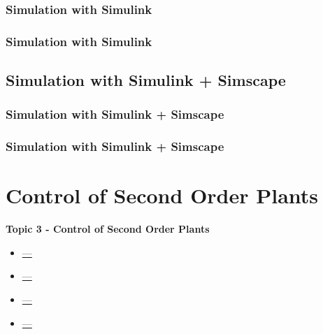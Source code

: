 \documentclass[fleqn]{beamer} %
\newcommand{\sectionIIItitle}{Control of Second Order Plants}
\newcommand{\sectionIIsubsectionIIItitle}{Simulation with Simulink}
\newcommand{\sectionIIsubsectionIVtitle}{Simulation with Simulink + Simscape}
\newcommand{\sectionIIIsubsectionItitle}{---}
\newcommand{\sectionIIIsubsectionIItitle}{---}
\newcommand{\sectionIIIsubsectionIIItitle}{---}
\newcommand{\sectionIIIsubsectionIVtitle}{---}
\begin{document}
			\begin{frame}
				\frametitle{\sectionIIsubsectionIIItitle}
				\bigskip

								
				\btVFill 
			\end{frame}

			\begin{frame}
				\frametitle{\sectionIIsubsectionIIItitle}
				\bigskip

				
				\btVFill 
			\end{frame}

			
		\subsection{\sectionIIsubsectionIVtitle}\label{sectionIIsubsectionIV}

			\begin{frame}[containsverbatim]
				\frametitle{\sectionIIsubsectionIVtitle}
				\bigskip

								
				\btVFill 
			\end{frame}	

			\begin{frame}
				\frametitle{\sectionIIsubsectionIVtitle}
				\bigskip


				\btVFill 
			\end{frame}	
		
	\section{\sectionIIItitle}\label{sectionIII}

		\begin{frame}
			\large \textbf{Topic 3 - \sectionIIItitle} \vspace{3mm}\\

			\begin{itemize}
				\item \hyperlink{sectionIIIsubsectionI}{\sectionIIIsubsectionItitle} \vspc %
				\item \hyperlink{sectionIIIsubsectionII}{\sectionIIIsubsectionIItitle} \vspc %
				\item \hyperlink{sectionIIIsubsectionIII}{\sectionIIIsubsectionIIItitle} \vspc %
				\item \hyperlink{sectionIIIsubsectionIV}{\sectionIIIsubsectionIVtitle} \vspc %
			\end{itemize}

		\end{frame}
\end{document}

